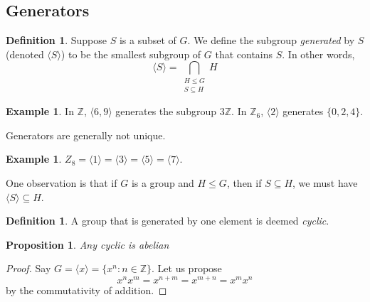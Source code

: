 \documentclass{article}
\newcommand{\Z}{\mathbb{Z}}
\newtheorem{proposition}[theorem]{Proposition}
\theoremstyle{definition}
\newtheorem{definition}[theorem]{Definition}
\newtheorem{example}[theorem]{Example}
\begin{document}
\subsection{Generators}
\begin{definition}
    Suppose $S$ is a subset of $G$. We define the subgroup \emph{generated} by $S$ (denoted $\langle S\rangle $) to be the smallest subgroup of $G$ that contains $S$. In other words, 
    \begin{equation*}
        \langle S\rangle =\bigcap_{\substack{H\leq G \\ S\subseteq H}}H
    \end{equation*}
\end{definition}
\begin{example}
    In $\Z$, $\langle6,9\rangle$ generates the subgroup $3\Z$. In $\Z_6$, $\langle 2\rangle$ generates $\{0,2,4\}$.
\end{example}
Generators are generally not unique. 
\begin{example}
    $Z_8 = \langle 1\rangle =\langle 3\rangle = \langle 5\rangle =\langle 7 \rangle$.
\end{example}
One observation is that if $G$ is a group and $H\leq G$, then if $S\subseteq H$, we must have $\langle S\rangle \subseteq H$.
\begin{definition}
    A group that is generated by one element is deemed \emph{cyclic}.
\end{definition}
\begin{proposition}
    Any cyclic is abelian
\end{proposition}
\begin{proof}
    Say $G=\langle x\rangle = \{ x^n : n\in \Z\}$. Let us propose 
    \begin{equation*}
        x^nx^m=x^{n+m} = x^{m+n} = x^mx^n
    \end{equation*}
    by the commutativity of addition.
\end{proof}
\end{document}
